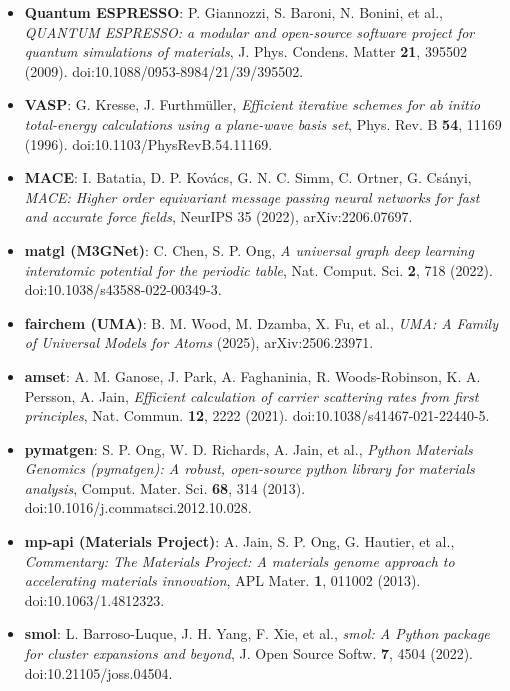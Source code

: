 \documentclass[11pt,a4paper]{article}
\begin{document}
\begin{itemize}[leftmargin=1.4em, itemsep=0.25em]
  \item \textbf{Quantum ESPRESSO}: P. Giannozzi, S. Baroni, N. Bonini, et al.,
        \emph{QUANTUM ESPRESSO: a modular and open-source software project for
        quantum simulations of materials}, J. Phys. Condens. Matter \textbf{21},
        395502 (2009). doi:10.1088/0953-8984/21/39/395502.
  \item \textbf{VASP}: G. Kresse, J. Furthm\"uller, \emph{Efficient iterative
        schemes for ab initio total-energy calculations using a plane-wave basis
        set}, Phys. Rev. B \textbf{54}, 11169 (1996).
        doi:10.1103/PhysRevB.54.11169.
  \item \textbf{MACE}: I. Batatia, D. P. Kov\'acs, G. N. C. Simm, C. Ortner,
        G. Cs\'anyi, \emph{MACE: Higher order equivariant message passing neural
        networks for fast and accurate force fields}, NeurIPS 35 (2022),
        arXiv:2206.07697.
  \item \textbf{matgl (M3GNet)}: C. Chen, S. P. Ong, \emph{A universal graph deep
        learning interatomic potential for the periodic table}, Nat. Comput.
        Sci. \textbf{2}, 718 (2022). doi:10.1038/s43588-022-00349-3.
  \item \textbf{fairchem (UMA)}: B. M. Wood, M. Dzamba, X. Fu, et al.,
        \emph{UMA: A Family of Universal Models for Atoms} (2025),
        arXiv:2506.23971.
  \item \textbf{amset}: A. M. Ganose, J. Park, A. Faghaninia, R. Woods-Robinson,
        K. A. Persson, A. Jain, \emph{Efficient calculation of carrier
        scattering rates from first principles}, Nat. Commun. \textbf{12}, 2222
        (2021). doi:10.1038/s41467-021-22440-5.
  \item \textbf{pymatgen}: S. P. Ong, W. D. Richards, A. Jain, et al.,
        \emph{Python Materials Genomics (pymatgen): A robust, open-source python
        library for materials analysis}, Comput. Mater. Sci. \textbf{68}, 314
        (2013). doi:10.1016/j.commatsci.2012.10.028.
  \item \textbf{mp-api (Materials Project)}: A. Jain, S. P. Ong, G. Hautier, et
        al., \emph{Commentary: The Materials Project: A materials genome approach
        to accelerating materials innovation}, APL Mater. \textbf{1}, 011002
        (2013). doi:10.1063/1.4812323.
  \item \textbf{smol}: L. Barroso-Luque, J. H. Yang, F. Xie, et al.,
        \emph{smol: A Python package for cluster expansions and beyond}, J. Open
        Source Softw. \textbf{7}, 4504 (2022). doi:10.21105/joss.04504.

\end{itemize}
\end{document}
